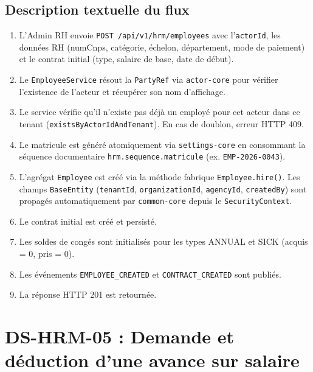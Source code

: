 \documentclass[a4paper,12pt,openany]{book}
\begin{document}
    \subsection{Description textuelle du flux}

    \begin{enumerate}
        \item L'Admin RH envoie \texttt{POST /api/v1/hrm/employees} avec l'\texttt{actorId}, les données RH (numCnps, catégorie, échelon, département, mode de paiement) et le contrat initial (type, salaire de base, date de début).

        \item Le \texttt{EmployeeService} résout la \texttt{PartyRef} via \texttt{actor-core} pour vérifier l'existence de l'acteur et récupérer son nom d'affichage.

        \item Le service vérifie qu'il n'existe pas déjà un employé pour cet acteur dans ce tenant (\texttt{existsByActorIdAndTenant}). En cas de doublon, erreur HTTP 409.

        \item Le matricule est généré atomiquement via \texttt{settings-core} en consommant la séquence documentaire \texttt{hrm.sequence.matricule} (ex. \texttt{EMP-2026-0043}).

        \item L'agrégat \texttt{Employee} est créé via la méthode fabrique \texttt{Employee.hire()}. Les champs \texttt{BaseEntity} (\texttt{tenantId}, \texttt{organizationId}, \texttt{agencyId}, \texttt{createdBy}) sont propagés automatiquement par \texttt{common-core} depuis le \texttt{SecurityContext}.

        \item Le contrat initial est créé et persisté.

        \item Les soldes de congés sont initialisés pour les types ANNUAL et SICK (acquis = 0, pris = 0).

        \item Les événements \texttt{EMPLOYEE\_CREATED} et \texttt{CONTRACT\_CREATED} sont publiés.

        \item La réponse HTTP 201 est retournée.
    \end{enumerate}


    \section{DS-HRM-05 : Demande et déduction d'une avance sur salaire}
\end{document}
